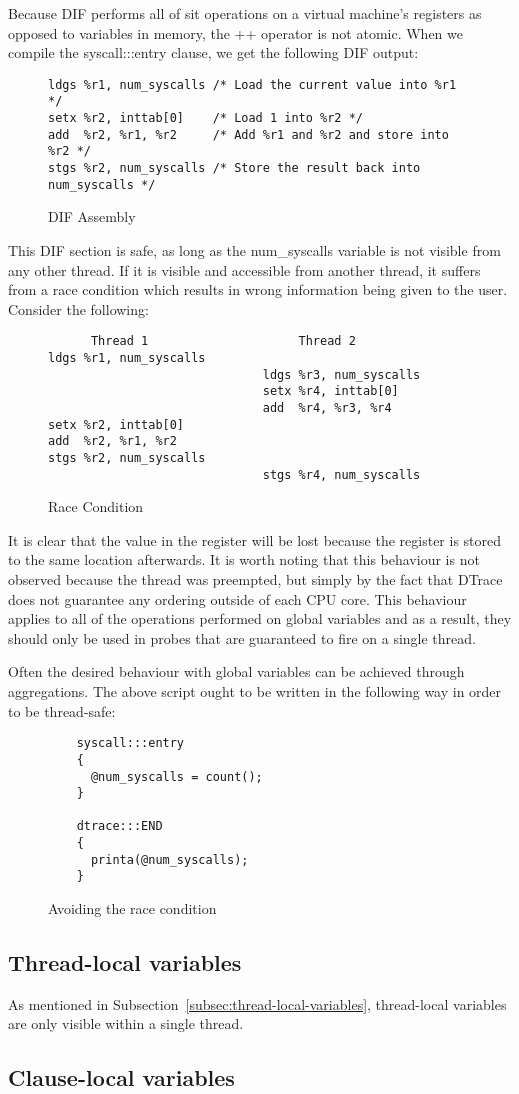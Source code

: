 \noindent
Because DIF performs all of sit operations on a virtual machine's
registers as opposed to variables in memory, the ++ operator is not
atomic. When we compile the syscall:::entry clause, we get the
following DIF output:

\begin{figure}
\begin{lstlisting}
ldgs %r1, num_syscalls /* Load the current value into %r1 */
setx %r2, inttab[0]    /* Load 1 into %r2 */
add  %r2, %r1, %r2     /* Add %r1 and %r2 and store into %r2 */
stgs %r2, num_syscalls /* Store the result back into num_syscalls */
\end{lstlisting}
\caption{DIF Assembly}
  \label{fig:dif-asm}
\end{figure}

\noindent
This DIF section is safe, as long as the num\_syscalls variable is not visible
from any other thread. If it is visible and accessible from another thread, it
suffers from a race condition which results in wrong information being given to
the user. Consider the following:

\begin{figure}
  \begin{lstlisting}
      Thread 1                     Thread 2
ldgs %r1, num_syscalls
                              ldgs %r3, num_syscalls
                              setx %r4, inttab[0]
                              add  %r4, %r3, %r4
setx %r2, inttab[0]
add  %r2, %r1, %r2
stgs %r2, num_syscalls
                              stgs %r4, num_syscalls
  \end{lstlisting}
  \caption{Race Condition}
  \label{fig:race}
\end{figure}

\noindent
It is clear that the value in the  register will be lost because
the register  is stored to the same location afterwards. It is
worth noting that this behaviour is not observed because the thread was
preempted, but simply by the fact that DTrace does not guarantee any ordering
outside of each CPU core. This behaviour applies to all of the operations
performed on global variables and as a result, they should only be used in
probes that are guaranteed to fire on a single thread.

\noindent
Often the desired behaviour with global variables can be achieved through
aggregations. The above script ought to be written in the following way in order
to be thread-safe:

\begin{figure}
  \begin{lstlisting}
    syscall:::entry
    {
      @num_syscalls = count();
    }

    dtrace:::END
    {
      printa(@num_syscalls);
    }
  \end{lstlisting}
  \caption{Avoiding the race condition}
  \label{fig:avoiding-the-race}
\end{figure}

\subsection{Thread-local variables}

As mentioned in Subsection~\ref{subsec:thread-local-variables}, thread-local
variables are only visible within a single thread.

\subsection{Clause-local variables}

